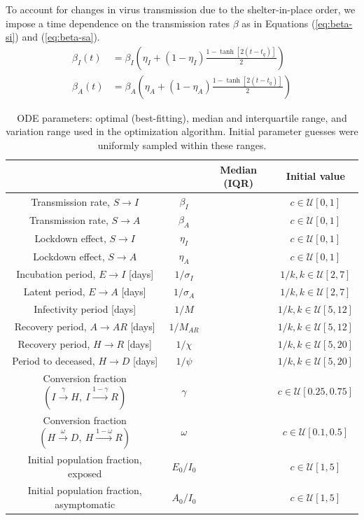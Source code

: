 \documentclass[11pt]{article}
\newcommand{\U}{\mathcal{U}}
\begin{document}
	To account for changes in virus transmission due to the shelter-in-place order, we impose a time dependence on the transmission rates $\beta$ as in Equations (\ref{eq:beta-si}) and (\ref{eq:beta-sa}).
	\begin{align}
		\label{eq:beta-si}
		\beta_{I} (t) &= \beta_{I} \left( \eta_{I} + (1 - \eta_{I}) \frac{1 - \tanh [2(t - t_q)]}{2} \right) \\
		\label{eq:beta-sa}
		\beta_{A} (t) &= \beta_{A} \left( \eta_{A} + (1 - \eta_{A}) \frac{1 - \tanh [2(t - t_q)]}{2} \right)
	\end{align}
	
	\begin{table}[h]
		\centering
		\caption{ODE parameters: optimal (best-fitting), median and interquartile range, and variation range used in the optimization algorithm.
			Initial parameter guesses were uniformly sampled within these ranges.}
		\label{tab:parameters}
		\begin{tabular}{ c c c c }
			\hline
			\hline
																								&					&	Median (IQR)	&	Initial value \\
			\hline
			Transmission rate, $S \to I$														&	$\beta_{I}$	&									&	$c \in \U [0,1]$ \\
			Transmission rate, $S \to A$														&	$\beta_{A}$	&									& 	$c \in \U [0,1]$ \\
			Lockdown effect, $S \to I$															&	$\eta_{I}$ 	&									& 	$c \in \U [0,1]$ \\
			Lockdown effect, $S \to A$															&	$\eta_{A}$		&									& 	$c \in \U [0,1]$ \\
			Incubation period, $E \to I$ [days]													&	$1 / \sigma_I$	&									& 	$1 / k, k \in \U [2,7]$ \\
			Latent period, $E \to A$ [days]														&	$1 / \sigma_A$	&									& 	$1 / k, k \in \U [2,7]$ \\
			Infectivity period [days]															&	$1 / M$			&									& 	$1 / k, k \in \U [5,12]$ \\
			Recovery period, $A \to AR$ [days]													&	$1 / M_{AR}$	&									& 	$1 / k, k \in \U [5,12]$ \\
			Recovery period, $H \to R$ [days]													&	$1 / \chi$		&									& 	$1 / k, k \in \U [5,20]$ \\
			Period to deceased, $H \to D$ [days]												&	$1 / \psi$		&									& 	$1 / k, k \in \U [5,20]$ \\
			Conversion fraction $(I \xrightarrow{\gamma} H, \ I \xrightarrow{1 - \gamma} R)$	&	$\gamma$		&									& 	$c \in \U [0.25,0.75]$ \\
			Conversion fraction $(H \xrightarrow{\omega} D, \ H \xrightarrow{1 - \omega} R)$	&	$\omega$		&									& 	$c \in \U [0.1,0.5]$ \\
			Initial population fraction, exposed												&	$E_0 / I_0$		&									& 	$c \in \U [1,5]$ \\
			Initial population fraction, asymptomatic											&	$A_0 / I_0$		&									& 	$c \in \U [1,5]$ \\
			\hline
			\hline
		\end{tabular}
	\end{table}
\end{document}
